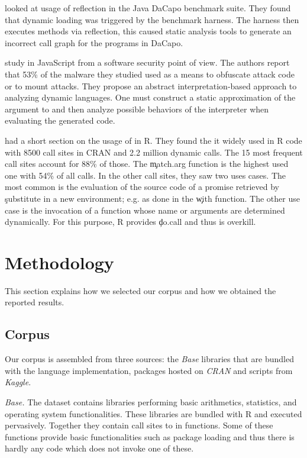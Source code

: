 \documentclass[review,nonacm,screen,acmsmall,anonymous=true]{acmart}
\newcommand{\mypara}[1]{\medskip\noindent\emph{#1}\xspace}
\begin{document}
\citet{bodden} looked at usage of reflection in the Java DaCapo benchmark suite.
They found that dynamic loading was triggered by the benchmark harness. The
harness then executes methods via reflection, this caused static analysis tools
to generate an incorrect call graph for the programs in DaCapo.

\citet{Arceri21} study \eval in JavaScript from a software security point of
view. The authors report that 53\% of the malware they studied used \eval as a
means to obfuscate attack code or to mount attacks. They propose an abstract
interpretation-based approach to analyzing dynamic languages. One must construct
a static approximation of the argument to \eval and then analyze possible
behaviors of the interpreter when evaluating the generated code.

\citet{ecoop12} had a short section on the usage of \eval in R. They found the
it widely used in R code with 8500 call sites in CRAN and 2.2 million dynamic
calls. The 15 most frequent call sites account for 88\% of those. The
\c{match.arg} function is the highest used one with 54\% of all calls. In the
other call sites, they saw two uses cases. The most common is the evaluation of
the source code of a promise retrieved by \c{substitute} in a new environment;
e.g. as done in the \c{with} function. The other use case is the invocation of a
function whose name or arguments are determined dynamically. For this purpose, R
provides \c{do.call} and thus \eval is overkill.


\newpage
\section{Methodology}

This section explains how we selected our corpus and how we obtained the
reported results.

\subsection{Corpus}

Our corpus is assembled from three sources: the \emph{Base} libraries that are
bundled with the language implementation, packages hosted on \emph{CRAN} and
scripts from \emph{Kaggle}.

\mypara{Base.} The dataset contains \BasePackages libraries performing basic
arithmetics, statistics, and operating system functionalities. These libraries
are bundled with R and executed pervasively. Together they contain
\BaseEvalCallSites call sites to \eval in \BaseFunsWithEvals functions. Some of these
functions provide basic functionalities such as package loading and thus there
is hardly any code which does not invoke one of these.
\end{document}
